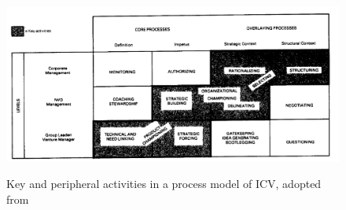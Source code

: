 \documentclass[12pt,letterpaper]{article}
\begin{document}
\begin{singlespace}
\begin{figure}[h]
\begin{centering}
  \caption{Key and peripheral activities in a process model of ICV, adopted from \cite{Burgelman1983b}}
  \includegraphics[width=\textwidth]{Burgelman1983b}
  \label{fig:Burgelman1983b}
\end{centering}
\end{figure}

\end{singlespace}
\end{document}
